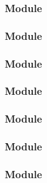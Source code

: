 \documentclass[t, notes, xcolor=table]{beamer}
\begin{document}
\begin{frame}
\frametitle{Module}

\end{frame}

\begin{frame}
\frametitle{Module}

\end{frame}

\begin{frame}
\frametitle{Module}

\end{frame}

\begin{frame}
\frametitle{Module}

\end{frame}

\begin{frame}
\frametitle{Module}

\end{frame}

\begin{frame}
\frametitle{Module}

\end{frame}

\begin{frame}
\frametitle{Module}

\end{frame}
\end{document}
